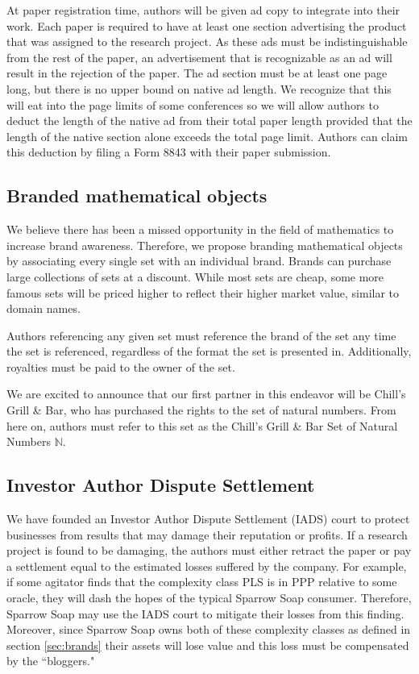 At paper registration time, authors will be given ad copy to integrate into
their work.
Each paper is required to have at least one section advertising the product
that was assigned to the research project.
As these ads must be indistinguishable from the rest of the paper, an
advertisement that is recognizable as an ad will result in the rejection of the
paper.
The ad section must be at least one page long, but there is no upper bound on
native ad length.
We recognize that this will eat into the page limits of some conferences so we
will allow authors to deduct the length of the native ad from their total paper
length provided that the length of the native section alone exceeds the total
page limit.
Authors can claim this deduction by filing a Form 8843 with their paper
submission.

\subsection{Branded mathematical objects}
\label{sec:brands}
We believe there has been a missed opportunity in the field of mathematics to
increase brand awareness.
Therefore, we propose branding mathematical objects by associating every single
set with an individual brand.
Brands can purchase large collections of sets at a discount.
While most sets are cheap, some more famous sets will be priced higher to
reflect their higher market value, similar to domain names.

Authors referencing any given set must reference the brand of the set any time
the set is referenced, regardless of the format the set is presented  in.
Additionally, royalties must be paid to the owner of the set.

We are excited to announce that our first partner in this endeavor will be
Chill's Grill \& Bar, who has purchased the rights to the set of natural
numbers.
From here on, authors must refer to this set as the Chill's Grill \& Bar Set of
Natural Numbers \(\mathbb{N}\).

\subsection{Investor Author Dispute Settlement}
We have founded an Investor Author Dispute Settlement (IADS) court to protect
businesses from results that may damage their reputation or profits.
If a research project is found to be damaging, the authors must either retract
the paper or pay a settlement equal to the estimated losses suffered by the
company.
For example, if some agitator finds that the complexity class PLS is in PPP
relative to some oracle, they will dash the hopes of the typical Sparrow Soap
consumer.
Therefore, Sparrow Soap may use the IADS court to mitigate their losses from
this finding.
Moreover, since Sparrow Soap owns both of these complexity classes as defined
in section \autoref{sec:brands} their assets will lose value and
this loss must be compensated by the ``bloggers."

